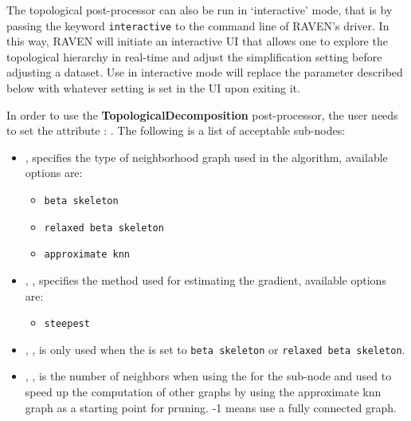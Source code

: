 The topological post-processor can also be run in `interactive' mode, that is
by passing the keyword \texttt{interactive} to the command line of RAVEN's
driver.
%
In this way, RAVEN will initiate an interactive UI that allows one to explore
the topological hierarchy in real-time and adjust the simplification setting
before adjusting a dataset. Use in interactive mode will replace the parameter
 described below with whatever setting is set in the UI
upon exiting it.

In order to use the \textbf{TopologicalDecomposition} post-processor, the user
needs to set the attribute :
.
The following is a list of acceptable sub-nodes:
\begin{itemize}
  \item {} , specifies the type
  of neighborhood graph used in the algorithm, available options are:
  \begin{itemize}
    \item \texttt{beta skeleton}
    \item \texttt{relaxed beta skeleton}
    \item \texttt{approximate knn}
  \end{itemize}
  \item {}, , specifies the
  method used for estimating the gradient, available options are:
  \begin{itemize}
    \item \texttt{steepest}
  \end{itemize}
  \item {}, \xmlDesc{float in the range: (0,2], optional field}, is
  only used when the  is set to \texttt{beta skeleton} or
  \texttt{relaxed beta skeleton}.
  \item {}, , is the number of
  neighbors when using the  for the 
  sub-node and used to speed up the computation of other graphs by using the
  approximate knn graph as a starting point for pruning. -1 means use a fully
  connected graph.

\end{itemize}
